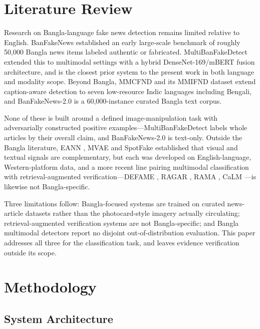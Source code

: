 \documentclass[conference,a4paper]{IEEEtran}
\begin{document}
\section{Literature Review}

Research on Bangla-language fake news detection remains limited relative to
English. BanFakeNews \cite{banfakenews} established an early large-scale
benchmark of roughly 50{,}000 Bangla news items labeled authentic or
fabricated. MultiBanFakeDetect \cite{multibanfake} extended this to multimodal
settings with a hybrid DenseNet-169/mBERT fusion architecture, and is the
closest prior system to the present work in both language and modality scope.
Beyond Bangla, MMCFND and its MMIFND dataset \cite{mmcfnd} extend caption-aware
detection to seven low-resource Indic languages including Bengali, and
BanFakeNews-2.0 \cite{banfakenews2} is a 60{,}000-instance curated Bangla text
corpus.

None of these is built around a defined image-manipulation task with
adversarially constructed positive examples---MultiBanFakeDetect labels whole
articles by their overall claim, and BanFakeNews-2.0 is text-only. Outside the
Bangla literature, EANN \cite{eann}, MVAE \cite{mvae} and SpotFake
\cite{spotfake} established that visual and textual signals are complementary,
but each was developed on English-language, Western-platform data, and a more
recent line pairing multimodal classification with retrieval-augmented
verification---DEFAME \cite{defame}, RAGAR \cite{ragar}, RAMA \cite{rama},
CaLM \cite{calm}---is likewise not Bangla-specific.

Three limitations follow: Bangla-focused systems are trained on curated
news-article datasets rather than the photocard-style imagery actually
circulating; retrieval-augmented verification systems are not Bangla-specific;
and Bangla multimodal detectors report no disjoint out-of-distribution
evaluation. This paper addresses all three for the classification task, and
leaves evidence verification outside its scope.

\section{Methodology}

\subsection{System Architecture}
\end{document}
